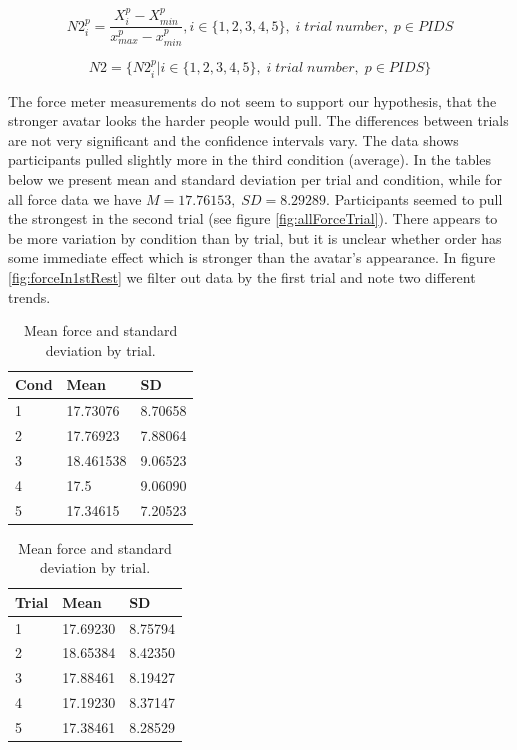 \[ N2_i^p=\frac{X_i^p-X_{min}^p}{x_{max}^p-x_{min}^p} , i \in \{1,2,3,4,5\},\; i \; trial \; number,\; p \in PIDS\]

\[N2= \{ N2_i^p |  i \in \{1,2,3,4,5\},\; i \; trial \; number,\; p \in PIDS \}  \]

The force meter measurements do not seem to support our hypothesis, that the stronger avatar looks the harder people would pull.  The differences between trials are not very significant and the confidence intervals vary. The data shows participants pulled slightly more in the third condition (average). In the tables below we present mean and standard deviation per trial and condition, while for all force data we have $M= 17.76153, \; SD=8.29289$.
Participants seemed to pull the strongest in the second trial (see figure \ref{fig:allForceTrial}). There appears to be more variation by condition than by trial, but it is unclear whether order has some immediate effect which is stronger than the avatar's appearance. In figure \ref{fig:forceIn1stRest} we filter out data by the first trial and note two different trends.

\begin{table}[H]
 \captionsetup{justification=centering,margin=0.1cm}
 \begin{minipage}{.5\linewidth}
     \centering
\begin{tabular}{|lll|}
\hline
Cond & Mean & SD \\
\hline
1 & 17.73076 & 8.70658\\  
2 &  17.76923 & 7.88064\\ 
3 & 18.461538& 9.06523\\ 
4 & 17.5& 9.06090\\  
5 & 17.34615 &7.20523\\  
\hline
\end{tabular}
\caption{Mean force and standard deviation by condition.}
\end{minipage}\hfill
 \begin{minipage}{.5\linewidth}
 \centering
\begin{tabular}{|lll|}
\hline
Trial & Mean & SD \\
\hline
1 & 17.69230 & 8.75794\\  
2 & 18.65384 & 8.42350\\  
3 & 17.88461 &  8.19427\\  
4 & 17.19230 & 8.37147\\  
5 & 17.38461 & 8.28529\\  
\hline
\end{tabular}
\caption{Mean force and standard deviation by trial.}
\end{minipage}
\end{table} 



